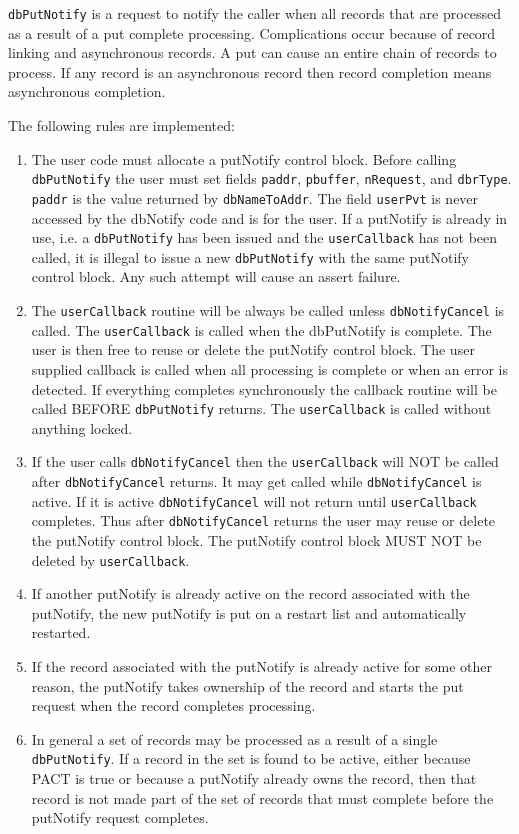 \verb|dbPutNotify| is a request to notify the caller when all records that are processed as a result of a put complete 
processing. Complications occur because of record linking and asynchronous records. A put can cause an entire chain of 
records to process. If any record is an asynchronous record then record completion means asynchronous completion.

The following rules are implemented:

\begin{enumerate}
\item The user code must allocate a putNotify control block. Before calling \verb|dbPutNotify| the user must set fields 
\verb|paddr|, \verb|pbuffer|, \verb|nRequest|, and \verb|dbrType|. \verb|paddr| is the value returned by \verb|dbNameToAddr|. The field 
\verb|userPvt| is never accessed by the dbNotify code and is for the user. If a putNotify is already in use, i.e. a 
\verb|dbPutNotify| has been issued and the \verb|userCallback| has not been called, it is illegal to issue a new 
\verb|dbPutNotify| with the same putNotify control block. Any such attempt will cause an assert failure.

\item The \verb|userCallback| routine will be always be called unless \verb|dbNotifyCancel| is called. The \verb|userCallback| 
is called when the dbPutNotify is complete. The user is then free to reuse or delete the putNotify control block. The 
user supplied callback is called when all processing is complete or when an error is detected. If everything 
completes synchronously the callback routine will be called BEFORE \verb|dbPutNotify| returns. The 
\verb|userCallback| is called without anything locked.

\item If the user calls \verb|dbNotifyCancel| then the \verb|userCallback| will NOT be called after \verb|dbNotifyCancel| 
returns. It may get called while \verb|dbNotifyCancel| is active. If it is active \verb|dbNotifyCancel| will not return 
until \verb|userCallback| completes. Thus after \verb|dbNotifyCancel| returns the user may reuse or delete the 
putNotify control block. The putNotify control block MUST NOT be deleted by \verb|userCallback|.

\item If another putNotify is already active on the record associated with the putNotify, the new putNotify is put on a 
restart list and automatically restarted.

\item If the record associated with the putNotify is already active for some other reason, the putNotify takes ownership of 
the record and starts the put request when the record completes processing.

\item In general a set of records may be processed as a result of a single \verb|dbPutNotify|. If a record in the set is found to 
be active, either because PACT is true or because a putNotify already owns the record, then that record is not made 
part of the set of records that must complete before the putNotify request completes.

\end{enumerate}

